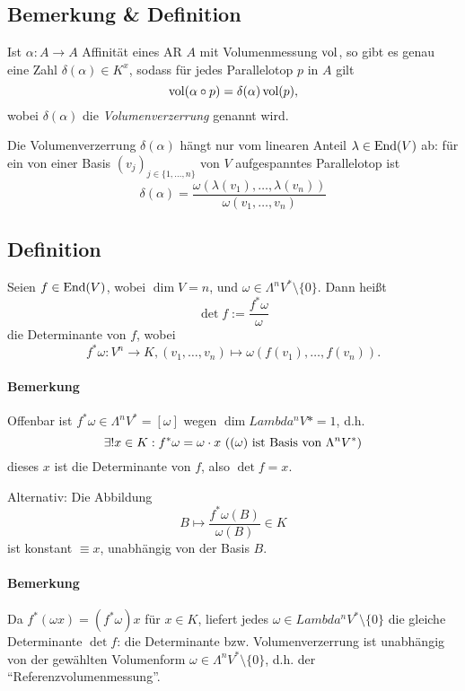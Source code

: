 \subsection{Bemerkung \& Definition}
	\begin{Definition}[Volumenverzerrung]
		Ist $ \alpha: A\to A $ Affinität eines AR $ A $ mit Volumenmessung $ \operatorname{vol} $, so gibt es genau eine Zahl $ \delta(\alpha)\in K^x $, sodass für jedes Parallelotop $ p $ in $ A $ gilt
			\[ \operatorname{vol}(\alpha\circ p) = \delta(\alpha)\operatorname{vol}(p), \]
		wobei $ \delta(\alpha) $ die \emph{Volumenverzerrung} genannt wird.
		
		Die Volumenverzerrung $ \delta(\alpha) $ hängt nur vom linearen Anteil $ \lambda\in \operatorname{End}(V) $ ab: für ein von einer Basis $ (v_j)_{j\in \{1,\dots,n\}} $ von $ V $ aufgespanntes Parallelotop ist
			\[ \delta(\alpha) = \frac{\omega(\lambda(v_1),\dots,\lambda(v_n))}{\omega(v_1,\dots,v_n)} \]
	\end{Definition}
\subsection{Definition}
	\begin{Definition}
		Seien $ f\in\operatorname{End}(V) $, wobei $ \dim V=n $, und $ \omega\in \Lambda^nV^*\setminus \{0\} $. Dann heißt
		\[ \det f:= \frac{f^*\omega}{\omega} \]
	die Determinante von $ f $, wobei
		\[ f^*\omega: V^n\to K, (v_1,\dots,v_n)\mapsto \omega(f(v_1),\dots,f(v_n)). \]
	\end{Definition}
\paragraph{Bemerkung}
	Offenbar ist $ f^*\omega\in \Lambda^nV^* = [\omega] $ wegen $ \dim Lambda^nV*=1 $, d.h.
		\[ \exists! x\in K: f^*\omega = \omega \cdot x \text{ ($(\omega) $ ist Basis von $ \Lambda^nV^* $)} \]
	dieses $ x $ ist die Determinante von $ f $, also $ \det f = x $.
	
	Alternativ: Die Abbildung
		\[ B\mapsto  \frac{f^*\omega(B)}{\omega(B)}\in K\]
	ist konstant $ \equiv x $, unabhängig von der Basis $ B $.
\paragraph{Bemerkung}
	Da $ f^*(\omega x) = (f^*\omega)x $ für $ x\in K $, liefert jedes $ \omega \in Lambda^nV^*\setminus\{0\} $ die gleiche Determinante $ \det f $: die Determinante bzw. Volumenverzerrung ist unabhängig von der gewählten Volumenform $ \omega\in \Lambda^nV^*\setminus \{0\} $, d.h. der "`Referenzvolumenmessung"'.
